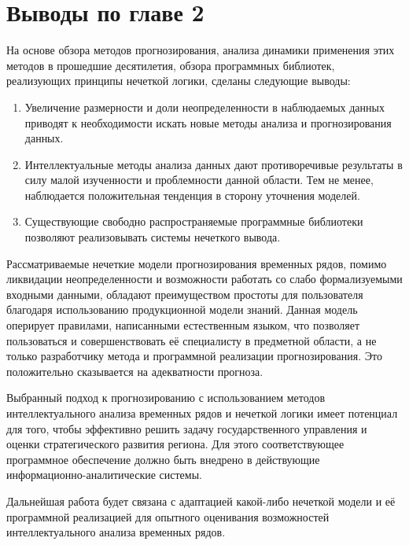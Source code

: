 \newpage
\section*{Выводы по главе 2}

На основе обзора методов прогнозирования, анализа динамики применения этих методов в прошедшие десятилетия, 
обзора программных библиотек, реализующих принципы нечеткой логики, сделаны следующие выводы:
\begin{enumerate}
    \item Увеличение размерности и доли неопределенности в наблюдаемых данных приводят к необходимости искать новые методы анализа и прогнозирования данных.
    \item Интеллектуальные методы анализа данных дают противоречивые результаты в силу малой изученности и проблемности данной области. Тем не менее, наблюдается положительная тенденция в сторону уточнения моделей.
    \item Существующие свободно распространяемые программные библиотеки позволяют реализовывать системы нечеткого вывода. 
\end{enumerate}

Рассматриваемые нечеткие модели прогнозирования временных рядов, помимо ликвидации неопределенности и возможности работать со слабо формализуемыми входными данными, 
обладают преимуществом простоты для пользователя благодаря использованию продукционной модели знаний. 
Данная модель оперирует правилами, написанными естественным языком, что позволяет пользоваться и совершенствовать её специалисту в предметной области, 
а не только разработчику метода и программной реализации прогнозирования. 
Это положительно сказывается на адекватности прогноза.

Выбранный подход к прогнозированию с использованием методов интеллектуального анализа временных рядов и нечеткой логики имеет потенциал для того, 
чтобы эффективно решить задачу государственного управления и оценки стратегического развития региона. 
Для этого соответствующее программное обеспечение должно быть внедрено в действующие информационно-аналитические системы. 

Дальнейшая работа будет связана с адаптацией какой-либо нечеткой модели 
и её программной реализацией для опытного оценивания возможностей интеллектуального анализа временных рядов.


